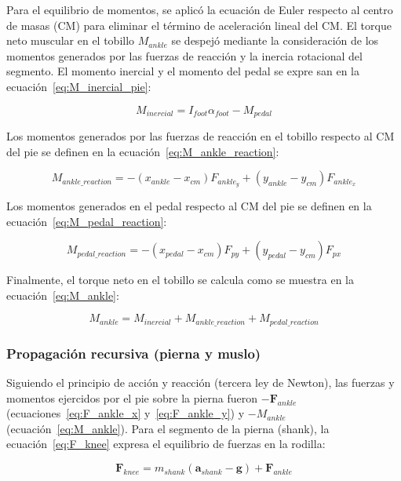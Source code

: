 Para el equilibrio de momentos, se aplicó la ecuación de Euler respecto al
centro de masas (CM) para eliminar el término de aceleración lineal del CM. El
torque neto muscular en el tobillo $M_{ankle}$ se despejó mediante la
consideración de los momentos generados por las fuerzas de reacción y la
inercia rotacional del segmento. El momento inercial y el momento del pedal se
expre san en la ecuación~\ref{eq:M_inercial_pie}:

\begin{equation}
  \label{eq:M_inercial_pie}
  M_{inercial} = I_{foot} \alpha_{foot} - M_{pedal}
\end{equation}

Los momentos generados por las fuerzas de reacción en el tobillo respecto al CM
del pie se definen en la ecuación~\ref{eq:M_ankle_reaction}:

\begin{equation}
  \label{eq:M_ankle_reaction}
  M_{ankle\_reaction} = -(x_{ankle}-x_{cm}) F_{ankle_y} + (y_{ankle}-y_{cm}) F_{ankle_x}
\end{equation}

Los momentos generados en el pedal respecto al CM del pie se definen en la ecuación~\ref{eq:M_pedal_reaction}:

\begin{equation}
  \label{eq:M_pedal_reaction}
  M_{pedal\_reaction} = -(x_{pedal}-x_{cm}) F_{py} + (y_{pedal}-y_{cm}) F_{px}
\end{equation}

Finalmente, el torque neto en el tobillo se calcula como se muestra en la
ecuación~\ref{eq:M_ankle}:

\begin{equation}
  \label{eq:M_ankle}
  M_{ankle} = M_{inercial} + M_{ankle\_reaction} + M_{pedal\_reaction}
\end{equation}

\subsubsection{Propagación recursiva (pierna y muslo)}
Siguiendo el principio de acción y reacción (tercera ley de Newton), las
fuerzas y momentos ejercidos por el pie sobre la pierna fueron
$-\mathbf{F}_{ankle}$ (ecuaciones~\ref{eq:F_ankle_x} y~\ref{eq:F_ankle_y}) y $-M_{ankle}$ (ecuación~\ref{eq:M_ankle}). Para el segmento de la pierna (shank),
la ecuación~\ref{eq:F_knee} expresa el equilibrio de fuerzas en la rodilla:

\begin{equation}
  \label{eq:F_knee}
  \mathbf{F}_{knee} = m_{shank} (\mathbf{a}_{shank} - \mathbf{g}) + \mathbf{F}_{ankle}
\end{equation}

